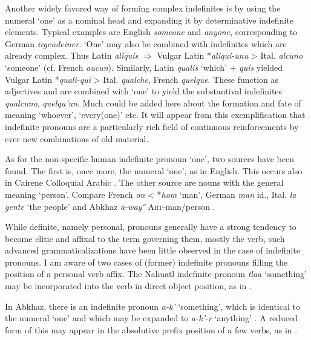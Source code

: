 Another widely favored way of forming complex indefinites is by using the numeral ‘one’ as a nominal head and expanding it by determinative indefinite elements. Typical examples are English \textit{someone} and \textit{anyone}, corresponding to German \textit{irgendeiner}. ‘One’ may also be combined with indefinites which are already complex. Thus Latin \textit{aliquis} $\Rightarrow $ Vulgar Latin *\textit{aliqui-unu} {\textgreater} Ital. \textit{alcuno} ‘someone’ (cf. French \textit{aucun}). Similarly, Latin \textit{qualis} ‘which’ + \textit{quis} yielded Vulgar Latin *\textit{quali-qui} {\textgreater} Ital. \textit{qualche}, French \textit{quelque}. These function as adjectives and are combined with ‘one’ to yield the substantival indefinites \textit{qualcuno}, \textit{quelqu'un}. Much could be added here about the formation and fate of meaning ‘whoever’, ‘every(one)’ etc. It will appear from this exemplification that indefinite pronouns are a particularly rich field of continuous reinforcements by ever new combinations of old material.

As for the non-specific human indefinite pronoun ‘one’, two sources have been found. The first is, once more, the numeral ‘one’, as in English. This occurs also in Cairene Colloquial Arabic \citep[79]{GaryEtAl1982}. The other source are nouns with the general meaning ‘person’. Compare French \textit{on} {\textless} *\textit{hom} ‘man’, German \textit{man} id., Ital. \textit{la gente} ‘the people’ and Abkhaz \textit{a-way°} \textsc{Art}{}-man/person \citep[157f]{Hewitt1979}.

While definite, namely personal, pronouns generally have a strong tendency to become clitic and affixal to the term governing them, mostly the verb, such advanced grammaticalizations have been little observed in the case of indefinite pronouns. I am aware of two cases of (former) indefinite pronouns filling the position of a personal verb affix. The Nahuatl indefinite pronoun \textit{tlaa} ‘something’ may be incorporated into the verb in direct object position, as in .

\noindent In Abkhaz, there is an indefinite pronoun \textit{a-k'} ‘something’, which is identical to the numeral ‘one’ and which may be expanded to \textit{a-k'-r} ‘anything’ \citep[158]{Hewitt1979}. A reduced form of this may appear in the absolutive prefix position of a few verbs, as in .


